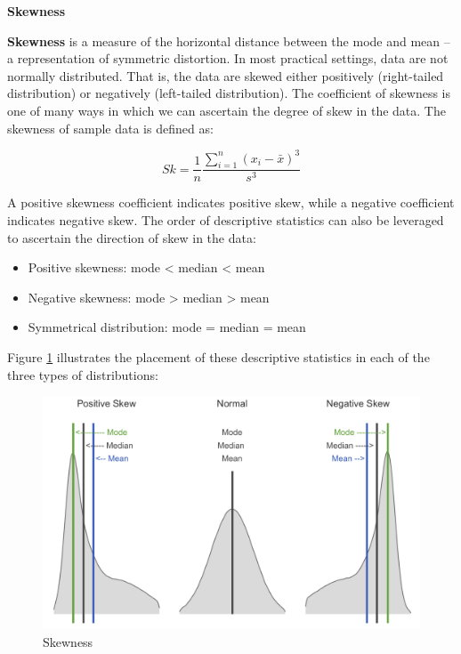 \documentclass[
]{book}
\providecommand{\tightlist}{%
  \setlength{\itemsep}{0pt}\setlength{\parskip}{0pt}}
\begin{document}
\textbf{Skewness}

\textbf{Skewness} is a measure of the horizontal distance between the mode and mean -- a representation of symmetric distortion. In most practical settings, data are not normally distributed. That is, the data are skewed either positively (right-tailed distribution) or negatively (left-tailed distribution). The coefficient of skewness is one of many ways in which we can ascertain the degree of skew in the data. The skewness of sample data is defined as:

\[ Sk = \frac{1}{n} \frac{\displaystyle\sum_{i=1}^{n} (x_i-\bar{x})^3}{s^3} \]

A positive skewness coefficient indicates positive skew, while a negative coefficient indicates negative skew. The order of descriptive statistics can also be leveraged to ascertain the direction of skew in the data:

\begin{itemize}
\tightlist
\item
  Positive skewness: mode \textless{} median \textless{} mean
\item
  Negative skewness: mode \textgreater{} median \textgreater{} mean
\item
  Symmetrical distribution: mode = median = mean
\end{itemize}

Figure \ref{fig:skewness} illustrates the placement of these descriptive statistics in each of the three types of distributions:

\begin{figure}

{\centering \includegraphics[width=1\linewidth]{graphics/skewness} 

}

\caption{Skewness}\label{fig:skewness}
\end{figure}
\end{document}
